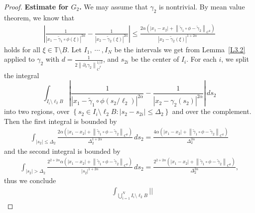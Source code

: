 \documentclass[reqno,centertags,12pt]{amsart}
\theoremstyle{definition}
\numberwithin{equation}{section}
\newcommand{\abs}[1]{\left\lvert#1\right\rvert}
\newcommand{\norm}[1]{\left\|#1\right\|}
\newcommand{\setbc}[2]{\left\{ #1\colon#2 \right\}}
\newcommand{\bbT}{{\mathbb{T}}}
\begin{document}
\begin{proof}
    \textbf{Estimate for $G_{2}$.} We may assume that $\gamma_{2}$ is nontrivial.
    By mean value theorem, we know that
    \begin{align*}
        \abs{
            \frac{1}{\abs{x_{1} - \tilde{\gamma}_{1}\circ\phi(\xi)}^{2\alpha}}
            - \frac{1}{\abs{x_{2} - \tilde{\gamma}_{2}(\xi)}^{2\alpha}}
        }
        \leq \frac{2\alpha\left(
            \abs{x_{1} - x_{2}}
            + \norm{\tilde{\gamma}_{1}\circ\phi - \tilde{\gamma}_{2}}_{C^{0}}
        \right)}
        {\abs{x_{2} - \tilde{\gamma}_{2}(\xi)}^{1+2\alpha}}
    \end{align*}
    holds for all $\xi\in \bbT\setminus B$.
    Let $I_{1},\ \cdots\ ,I_{N}$ be the intervals
    we get from Lemma~\ref{L3.2} applied to $\gamma_{2}$ with
    $d = \frac{1}{2\norm{\partial_{s}\gamma_{2}}_{\dot{C}^{\beta}}^{1/\beta}}$, and
    $s_{2i}$ be the center of $I_{i}$. For each $i$, we split the integral
    \[
        \int_{I_{i}\setminus \ell_{2}B}\abs{
            \frac{1}{\abs{x_{1} - \tilde{\gamma}_{1}\circ\phi(s_{2}/\ell_{2})}^{2\alpha}}
            - \frac{1}{\abs{x_{2} - \gamma_{2}(s_{2})}^{2\alpha}}
        }\,ds_{2}
    \]
    into two regions, over $\setbc{s_{2}\in I_{i}\setminus \ell_{2}B}
    {\abs{s_{2} - s_{2i}}\leq \Delta_{2}}$ and over the complement. Then the first integral is
    bounded by
    \begin{align*}
        \int_{\abs{s_{2}}\leq \Delta_{2}}
        \frac{2\alpha\left(
            \abs{x_{1} - x_{2}}
            + \norm{\tilde{\gamma}_{1}\circ\phi - \tilde{\gamma}_{2}}_{C^{0}}
        \right)}
        {\Delta_{2}^{1+2\alpha}}\,ds_{2}
        = \frac{4\alpha\left(
            \abs{x_{1} - x_{2}}
            + \norm{\tilde{\gamma}_{1}\circ\phi - \tilde{\gamma}_{2}}_{C^{0}}
        \right)}
        {\Delta_{2}^{2\alpha}}
    \end{align*}
    and the second integral is bounded by
    \begin{align*}
        \int_{\abs{s_{2}}>\Delta_{2}}
        \frac{2^{2+2\alpha}\alpha
        \left(
            \abs{x_{1} - x_{2}}
            + \norm{\tilde{\gamma}_{1}\circ\phi - \tilde{\gamma}_{2}}_{C^{0}}
        \right)}
        {\abs{s_{2}}^{1+2\alpha}}\,ds_{2}
        = \frac{2^{2+2\alpha}\left(
            \abs{x_{1} - x_{2}}
            + \norm{\tilde{\gamma}_{1}\circ\phi - \tilde{\gamma}_{2}}_{C^{0}}
        \right)}
        {\Delta_{2}^{2\alpha}},
    \end{align*}
    thus we conclude
    \begin{align*}
        &\int_{\bigcup_{i=1}^{N}I_{i}\setminus \ell_{2}B}\abs{
}
\end{align*}
\end{proof}
\end{document}
